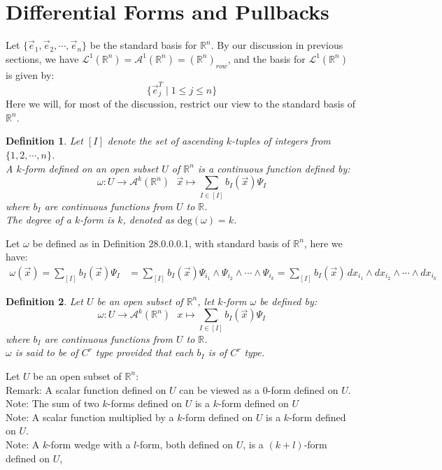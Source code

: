 \documentclass[15pt]{book}
\theoremstyle{break}
\theoremstyle{break}
\newtheorem{defn}{Definition}[corL]
\newcommand{\R}{\mathbb{R}}
\newcommand{\Lt}{\mathcal{L}}
\newcommand{\A}{\mathcal{A}}
\newcommand{\note}{\color{red}Note: \color{black}}
\newcommand{\remark}{\color{blue}Remark: \color{black}}
\begin{document}
\newpage
\section[Differential Forms and Pullbacks]{\color{red}Differential Forms and Pullbacks\color{black}}
Let $\{\vec{e}_1,\vec{e}_2,\cdots,\vec{e}_n\}$ be the standard basis for $\R^n$. By our discussion in previous sections, we have $\Lt^1(\R^n) = \A^1(\R^n) = (\R^n)_{row}$, and the basis for $\Lt^1(\R^n)$ is given by: 
$$\{\vec{e}^T_j \mid 1 \leq j \leq n\}$$ 
Here we will, for most of the discussion, restrict our view to the standard basis of $\R^n$. 

\begin{defn}
Let $[I]$ denote the set of ascending $k$-tuples of integers from $\{1,2,\cdots, n\}$. \\
A $k$-form defined on an open subset $U$ of $\R^n$ is a continuous function defined by: 
$$\omega:U \to \A^k(\R^n) \ \ \ \vec{x}\mapsto \sum_{I \in [I]} b_I(\vec{x}) \Psi_I$$
where $b_I$ are continuous functions from $U$ to $\R$. \\The degree of a $k$-form is $k$, denoted as $\text{deg}(\omega) = k$. 
\end{defn}

Let $\omega$ be defined as in Definition 28.0.0.0.1, with standard basis of $\R^n$, here we have:
\begin{align*}
 \omega(\vec{x}) = \sum_{[I]} b_I(\vec{x}) \Psi_I 
 &= \sum_{[I]} b_I(\vec{x}) \Psi_{i_1}\wedge \Psi_{i_2}\wedge \cdots \wedge \Psi_{i_k}= \sum_{[I]} b_I(\vec{x})\, dx_{i_1}\wedge dx_{i_2}\wedge \cdots \wedge dx_{i_k} \tag{W}
\end{align*}

\begin{defn}
Let $U$ be an open subset of $\R^n$, let $k$-form $\omega$ be defined by:
$$\omega :U \to \A^k(\R^n) \ \ \ x\mapsto \sum_{I \in [I]} b_I(\vec{x}) \Psi_I $$ 
where $b_I$ are continuous functions from $U$ to $\R$. \\
$\omega$ is said to be of $C^r$ type provided that each $b_I$ is of $C^r$ type. 
\end{defn}

Let $U$ be an open subset of $\R^n$:\\
\remark A scalar function defined on $U$ can be viewed as a $0$-form defined on $U$. \\
\note The sum of two $k$-forms defined on $U$ is a $k$-form defined on $U$\\
\note A scalar function multiplied by a $k$-form defined on $U$ is a $k$-form defined on $U$.\\
\note A $k$-form wedge with a $l$-form, both defined on $U$, is a $(k+l)$-form defined on $U$,\\
\end{document}
